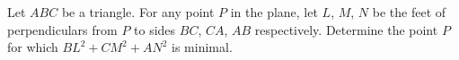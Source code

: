 Let $ABC$ be a triangle. For any point $P$ in the plane, let $L$, $M$, $N$ be the feet of perpendiculars from $P$ to sides $BC$, $CA$, $AB$ respectively.
Determine the point $P$ for which $BL^2 + CM^2 + AN^2$ is minimal.
